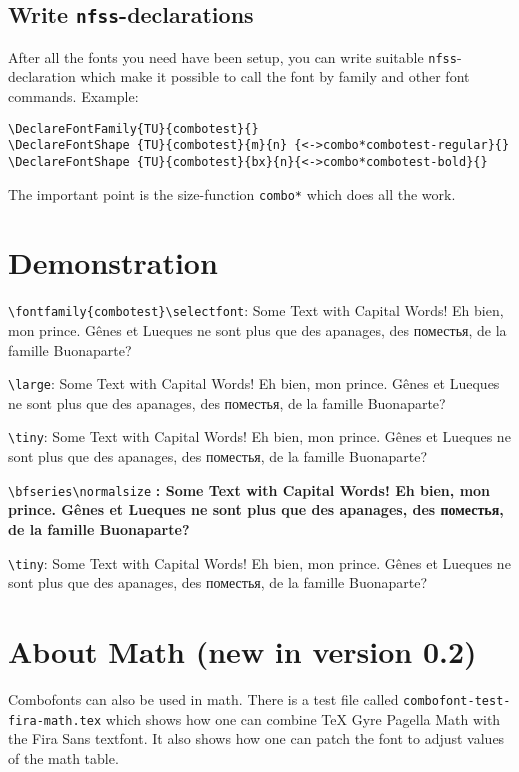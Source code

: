 \documentclass[parskip=half-,egregdoesnotlikesansseriftitles]{scrartcl}
\begin{document}
\subsection{Write \texttt{nfss}-declarations}

After all the fonts you need have been setup, you can write suitable \texttt{nfss}-declaration which make it possible to call the font by family and other font commands. Example:

\begin{verbatim}
\DeclareFontFamily{TU}{combotest}{}
\DeclareFontShape {TU}{combotest}{m}{n} {<->combo*combotest-regular}{}
\DeclareFontShape {TU}{combotest}{bx}{n}{<->combo*combotest-bold}{}
\end{verbatim}

The important point is the size-function \verb+combo*+ which does all the work.


\section{Demonstration}


\verb+\fontfamily{combotest}\selectfont+:
\selectfont
Some Text with Capital Words!
Eh bien, mon prince. Gênes et Lueques ne sont plus que des
apanages, des поместья, de la famille Buonaparte?
%

\verb+\large+\large:
Some Text with Capital Words!
Eh bien, mon prince. Gênes et Lueques ne sont plus que des
apanages, des поместья, de la famille Buonaparte?

\verb+\tiny+\tiny:
Some Text with Capital Words!
Eh bien, mon prince. Gênes et Lueques ne sont plus que des
apanages, des поместья, de la famille Buonaparte?

\verb+\bfseries\normalsize+\bfseries
\normalsize:
Some Text with Capital Words!
Eh bien, mon prince. Gênes et Lueques ne sont plus que des
apanages, des поместья, de la famille Buonaparte?


\verb+\tiny+\tiny:
Some Text with Capital Words!
Eh bien, mon prince. Gênes et Lueques ne sont plus que des
apanages, des поместья, de la famille Buonaparte?
%

\normalfont\normalsize

\section{About Math (new in version 0.2)}\enlargethispage{2\baselineskip}

Combofonts can also be used in math. There is a test file called \texttt{combofont-test-fira-math.tex} which shows how one can combine \textsf{TeX Gyre Pagella Math} with the \textsf{Fira Sans} textfont. It also shows how one can patch the font to adjust values of the math table.
\end{document}
